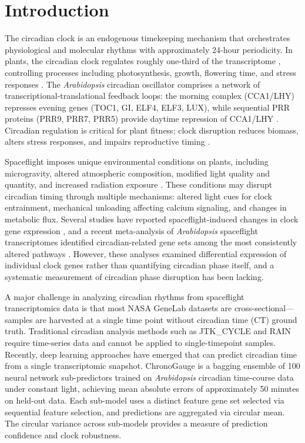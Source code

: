 \documentclass[11pt,a4paper]{article}
\begin{document}
\section*{Introduction}

The circadian clock is an endogenous timekeeping mechanism that orchestrates physiological and molecular rhythms with approximately 24-hour periodicity. In plants, the circadian clock regulates roughly one-third of the transcriptome \citep{Covington2008}, controlling processes including photosynthesis, growth, flowering time, and stress responses \citep{Harmer2000}. The \textit{Arabidopsis} circadian oscillator comprises a network of transcriptional-translational feedback loops: the morning complex (CCA1/LHY) represses evening genes (TOC1, GI, ELF4, ELF3, LUX), while sequential PRR proteins (PRR9, PRR7, PRR5) provide daytime repression of CCA1/LHY \citep{Pokhilko2012}. Circadian regulation is critical for plant fitness; clock disruption reduces biomass, alters stress responses, and impairs reproductive timing \citep{Dodd2005}.

Spaceflight imposes unique environmental conditions on plants, including microgravity, altered atmospheric composition, modified light quality and quantity, and increased radiation exposure \citep{Paul2012}. These conditions may disrupt circadian timing through multiple mechanisms: altered light cues for clock entrainment, mechanical unloading affecting calcium signaling, and changes in metabolic flux. Several studies have reported spaceflight-induced changes in clock gene expression \citep{Kiss2019}, and a recent meta-analysis of \textit{Arabidopsis} spaceflight transcriptomes identified circadian-related gene sets among the most consistently altered pathways \citep{Barker2023}. However, these analyses examined differential expression of individual clock genes rather than quantifying circadian phase itself, and a systematic measurement of circadian phase disruption has been lacking.

A major challenge in analyzing circadian rhythms from spaceflight transcriptomics data is that most NASA GeneLab datasets are cross-sectional---samples are harvested at a single time point without circadian time (CT) ground truth. Traditional circadian analysis methods such as JTK\_CYCLE \citep{Hughes2010} and RAIN \citep{Thaben2014} require time-series data and cannot be applied to single-timepoint samples. Recently, deep learning approaches have emerged that can predict circadian time from a single transcriptomic snapshot. ChronoGauge \citep{Reynolds2025} is a bagging ensemble of 100 neural network sub-predictors trained on \textit{Arabidopsis} circadian time-course data under constant light, achieving mean absolute errors of approximately 50 minutes on held-out data. Each sub-model uses a distinct feature gene set selected via sequential feature selection, and predictions are aggregated via circular mean. The circular variance across sub-models provides a measure of prediction confidence and clock robustness.
\end{document}
